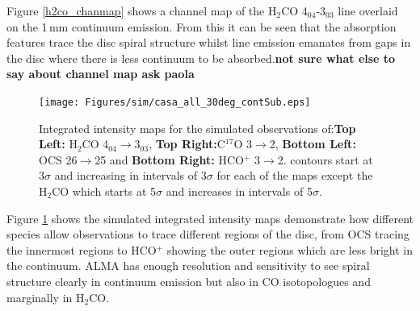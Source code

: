 \documentclass[useAMS,usenatbib]{mn2e}
\begin{document}
Figure \ref{h2co_chanmap} shows a channel map of the H$_2$CO 4$_{04}$-$3_{03}$ line overlaid on the 1$\,$mm continuum emission. From this it can be seen that the absorption features trace the disc spiral structure whilst line emission emanates from gaps in the disc where there is less continuum to be absorbed.{\bf not sure what else to say about channel map ask paola}



%

\begin{figure}
 \texttt{[image: Figures/sim/casa\_all\_30deg\_contSub.eps]}
 \caption{Integrated intensity maps for the simulated observations of:{\bf Top Left:} H$_2$CO 4$_{04}\rightarrow$3$_{03}$, {\bf Top Right:}C$^{17}$O 3$\rightarrow$2, {\bf Bottom Left:} OCS 26$\rightarrow$25 and {\bf Bottom Right:} HCO$^+$ 3$\rightarrow$2. contours start at 3$\sigma$ and increasing in intervals of 3$\sigma$ for each of the maps except the H$_2$CO which starts at 5$\sigma$ and increases in intervals of 5$\sigma$.}
\label{mom0_maps}
\end{figure}

Figure \ref{mom0_maps} shows the simulated integrated intensity maps demonstrate how different species allow observations to trace different regions of the disc, from OCS tracing the innermost regions to HCO$^+$ showing the outer regions which are less bright in the continuum. ALMA has enough resolution and sensitivity to see spiral structure clearly in continuum emission but also in CO isotopologues and marginally in H$_2$CO.

%
\end{document}
